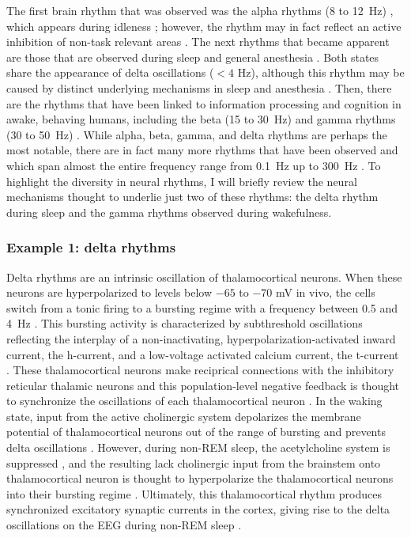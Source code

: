 The first brain rhythm that was observed was the alpha rhythms (8 to \qty{12}{\hertz}) \cite{Berger1929}, which appears during idleness \cite{Adrian1934}; however, the rhythm may in fact reflect an active inhibition of non-task relevant areas \cite{Cooper2003}. The next rhythms that became apparent are those that are observed during sleep \cite{Loomis1937,Weber2016} and general anesthesia \cite{GIBBS1937,Akeju2017}. Both states share the appearance of delta oscillations ($<4$ \unit{\hertz}), although this rhythm may be caused by distinct underlying mechanisms in sleep and anesthesia \cite{Akeju2017}. Then, there are the rhythms that have been linked to information processing and cognition in awake, behaving humans, including the beta (15 to \qty{30}{\hertz}) \cite{Spitzer2017} and gamma rhythms (30 to \qty{50}{\hertz}) \cite{JASPER1938,Fries2009}. While alpha, beta, gamma, and delta rhythms are perhaps the most notable, there are in fact many more rhythms that have been observed and which span almost the entire frequency range from \qty{0.1}{\hertz} up to \qty{300}{\hertz} \cite{Penttonen2003}. To highlight the diversity in neural rhythms, I will briefly review the neural mechanisms thought to underlie just two of these rhythms: the delta rhythm during sleep and the gamma rhythms observed during wakefulness.

\subsubsection{Example 1: delta rhythms}
Delta rhythms are an intrinsic oscillation of thalamocortical neurons. When these neurons are hyperpolarized to levels below $-65$ to $-70$ \unit{\milli\volt} in vivo, the cells switch from a tonic firing to a bursting regime with a frequency between 0.5 and \qty{4}{\hertz} \cite{Dossi1992}. This bursting activity is characterized by subthreshold oscillations reflecting the interplay of a non-inactivating, hyperpolarization-activated inward current, the h-current, and a low-voltage activated calcium current, the t-current \cite{McCormick1990,Soltesz1991}. These thalamocortical neurons make reciprical connections with the inhibitory reticular thalamic neurons and this population-level negative feedback is thought to synchronize the oscillations of each thalamocortical neuron \cite{Steriade1991, Steriade1993}. In the waking state, input from the active cholinergic system depolarizes the membrane potential of thalamocortical neurons out of the range of bursting and prevents delta oscillations \cite{Steriade2003}. However, during non-REM sleep, the acetylcholine system is suppressed \cite{Watson2010}, and the resulting lack cholinergic input from the brainstem onto thalamocortical neuron is thought to hyperpolarize the thalamocortical neurons into their bursting regime \cite{Steriade2003}. Ultimately, this thalamocortical rhythm produces synchronized excitatory synaptic currents in the cortex, giving rise to the delta oscillations on the EEG during non-REM sleep \cite{Amzica1998}.

